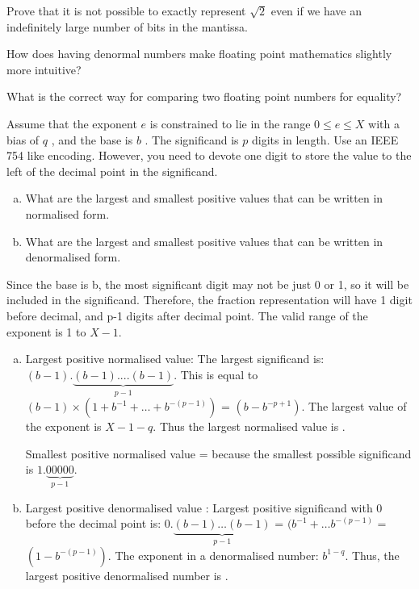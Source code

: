 \begin{ExerciseList}
\Exercise[difficulty=1]
Prove that it is not possible to exactly represent $\sqrt{2}$ even if we have an indefinitely
large number of bits in the mantissa.

\Exercise[difficulty=1]
How does having denormal numbers make floating point mathematics slightly more intuitive?

\Exercise[difficulty=1]
What is the correct way for comparing two floating point numbers for equality?


\Exercise[difficulty=2]
Assume that the exponent $e$ is constrained to lie in the range $0 \leq e \leq X$ with a bias of $q$ , and the base is $b$ . The
significand is $p$ digits in length.
Use an IEEE 754 like encoding. However,
you need to devote one digit to store the value to the left of the decimal point in the significand.

\begin{enumerate}[a) ]
\item What are the largest and smallest positive values that can be written in normalised form.
\item What are the largest and smallest positive values that can be written in denormalised form.
\end{enumerate}

\Answer Since the base is b, the most significant digit may not be just 0 or 1, so it will be included in the significand. Therefore, the fraction representation will have 1 digit before decimal, and p-1 digits after decimal point. The valid range of the exponent is 1 to $X-1$. 

\begin{enumerate}[a) ]
\item Largest positive normalised value:
The largest significand is: $(b-1).\underbrace{(b-1) .... (b-1)}_{p-1}$.
This is equal to $(b-1) \times (1 + b^{-1} + \ldots + b^{-(p-1)})$ = $(b - b^{-p+1})$. 
The largest value of the exponent is $X - 1 - q$. Thus the largest normalised value is
. 

Smallest positive normalised value =  because the smallest possible
significand is $1.\underbrace{00000}_{p-1}$. 

\item Largest positive denormalised value : 
Largest positive significand with 0 before the decimal point is: $0.\underbrace{(b-1) \ldots (b-1)}_{p-1}$ 
= $(b^{-1} + \ldots b^{-(p-1)}$ = $ (1 - b^{-(p-1)})$. The exponent in a denormalised number: $b^{1-q}$.
Thus, the largest positive denormalised number is . 


\end{enumerate}
\end{ExerciseList}
